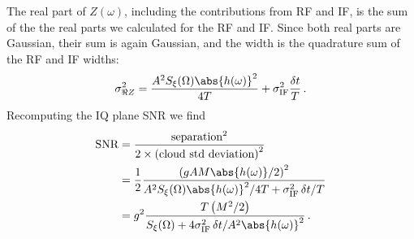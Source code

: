 
The real part of $Z(\omega)$, including the contributions from RF and IF, is the sum of the the real parts we calculated for the RF and IF.
Since both real parts are Gaussian, their sum is again Gaussian, and the width is the quadrature sum of the RF and IF widths:
\begin{equation}
  \sigma_{\Re Z}^2 =
    \frac{A^2 S_\xi(\Omega) \abs{h(\omega)}^2}{4T}
    + \sigma_\text{IF}^2 \frac{\delta t}{T} \, .
\end{equation}
Recomputing the IQ plane SNR we find
\begin{align}
  \text{SNR}
    &= \frac{\text{separation}^2}{2 \times \left( \text{cloud std deviation} \right)^2} \nonumber \\
    &= \frac{1}{2}
       \frac{\left( g A M \abs{h(\omega)} / 2 \right)^2}
            {A^2 S_\xi(\Omega) \abs{h(\omega)}^2 / 4T + \sigma_\text{IF}^2 \, \delta t / T} \nonumber \\
    &= g^2 \frac{T \left( M^2 / 2 \right)}
            {S_\xi(\Omega) + 4 \sigma_\text{IF}^2 \, \delta t / A^2 \abs{h(\omega)}^2}
  \, .
\end{align}

